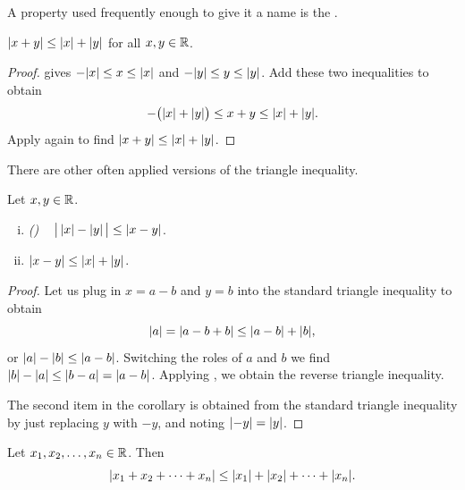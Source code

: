 A property used frequently enough to give it a name is the
\emph{}.

\begin{prop}
$\lvert {x+y} \rvert \leq \lvert {x} \rvert+\lvert {y} \rvert$
for all $x, y \in {\mathbb{R}}$.
\end{prop}

\begin{proof}
 gives
$- \lvert {x} \rvert \leq x \leq \lvert {x} \rvert$ and
$- \lvert {y} \rvert \leq y \leq \lvert {y} \rvert$.  Add these two inequalities to obtain
\begin{equation*}
- \bigl(\lvert {x} \rvert+\lvert {y} \rvert\bigr) \leq x+y \leq \lvert {x} \rvert+ \lvert {y} \rvert .
\end{equation*}
Apply  again to find
$\lvert {x+y} \rvert \leq \lvert {x} \rvert+\lvert {y} \rvert$.
\end{proof}

There are other often applied versions of the triangle inequality.

\begin{cor}
Let $x,y \in {\mathbb{R}}$.
\begin{enumerate}[(i)]
\item \emph{()}
~
$\bigl\lvert { \, \lvert {x} \rvert-\lvert {y} \rvert \, } \bigr\rvert \leq \lvert {x-y} \rvert$.
\item $\lvert {x-y} \rvert \leq \lvert {x} \rvert+\lvert {y} \rvert$.
\end{enumerate}
\end{cor}

\begin{proof}
Let us plug in $x=a-b$ and $y=b$ into the standard
triangle inequality to obtain
\begin{equation*}
\lvert {a} \rvert = \lvert {a-b+b} \rvert \leq \lvert {a-b} \rvert + \lvert {b} \rvert ,
\end{equation*}
or $\lvert {a} \rvert-\lvert {b} \rvert \leq \lvert {a-b} \rvert$.  Switching the roles of $a$ and $b$
we find
$\lvert {b} \rvert-\lvert {a} \rvert \leq \lvert {b-a} \rvert = \lvert {a-b} \rvert$.  Applying
, we obtain the reverse triangle
inequality.

The second item in the corollary is obtained from the standard
triangle inequality by just replacing $y$ with $-y$, and noting $\lvert {-y} \rvert =
\lvert {y} \rvert$.
\end{proof}

\begin{cor}
Let $x_1, x_2, \ldots, x_n \in {\mathbb{R}}$.  Then
\begin{equation*}
\lvert {x_1 + x_2 + \cdots + x_n} \rvert \leq
\lvert {x_1} \rvert + \lvert {x_2} \rvert + \cdots + \lvert {x_n} \rvert .
\end{equation*}
\end{cor}

